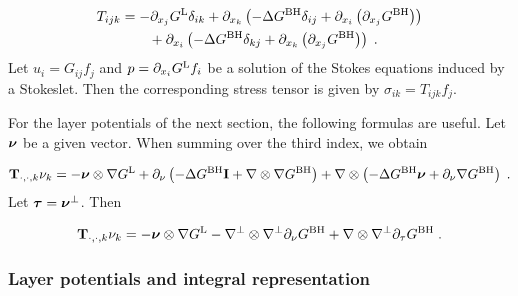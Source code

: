\begin{align}
  T_{ijk} &= - \partial_{x_j} G^{\textrm{L}} \delta_{ik}
  + \partial_{x_k} \left ( -\Delta G^{\textrm{BH}} \delta_{ij} +
  \partial_{x_i} \left(\partial_{x_j} G^{\textrm{BH}} \right) \right)
  \nonumber \\
  & \qquad+ \partial_{x_i} \left ( -\Delta G^{\textrm{BH}} \delta_{kj} +
  \partial_{x_k} \left(\partial_{x_j} G^{\textrm{BH}} \right) \right)
  \; .
\end{align}
Let $u_i = G_{ij} f_j$ and $p = \partial_{x_i} G^{\textrm{L}} f_i$ be a
solution of the Stokes equations induced by a Stokeslet.
Then the corresponding stress tensor is given by
$\sigma_{ik} = T_{ijk} f_j$.

For the layer potentials of the next section, the following
formulas are useful. Let ${\boldsymbol \nu}$ be a given vector. When
summing over the third index, we obtain

\begin{equation}
  {\bf T}_{\cdot,\cdot,k} \nu_k = -{\boldsymbol \nu} \otimes \nabla G^{\textrm{L}}
  + \partial_\nu \left ( -\Delta G^{\textrm{BH}} {\bf I}
  + \nabla \otimes \nabla G^{\textrm{BH}} \right)
  + \nabla \otimes \left ( -\Delta G^{\textrm{BH}} {\boldsymbol \nu}
  + \partial_{\nu} \nabla G^{\textrm{BH}} \right) \; .
\end{equation}
Let ${\boldsymbol \tau} = {\boldsymbol \nu}^\bot$. Then

\begin{equation}
  {\bf T}_{\cdot,\cdot,k} \nu_k = -{\boldsymbol \nu} \otimes \nabla G^{\textrm{L}}
  - \nabla^\bot \otimes \nabla^\bot \partial_\nu G^{\textrm{BH}}
  +\nabla \otimes \nabla^\bot \partial_\tau G^{\textrm{BH}} \; .
\end{equation}

\subsubsection{Layer potentials and integral representation}

